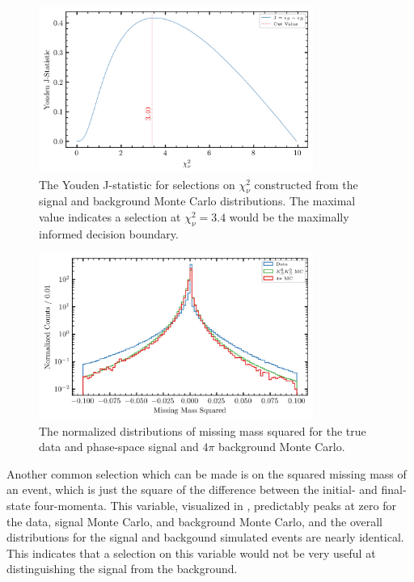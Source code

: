 \begin{figure}
  \begin{center}
    \includegraphics[width=0.8\textwidth]{figures/data_combined_chisqdof_youden_j.png}
  \end{center}
  \caption{The Youden J-statistic for selections on $\chi^2_\nu$ constructed from the signal and background Monte Carlo distributions. The maximal value indicates a selection at $\chi^2_\nu = 3.4$ would be the maximally informed decision boundary.}\label{fig:data-combined-chisqdof-youden-j}
\end{figure}


\begin{figure}
  \begin{center}
    \includegraphics[width=0.8\textwidth]{figures/data_combined_mm2.png}
  \end{center}
  \caption{The normalized distributions of missing mass squared for the true data and phase-space signal and $4\pi$ background Monte Carlo.}\label{fig:data-combined-mm2}
\end{figure}

Another common selection which can be made is on the squared missing mass of an event, which is just the square of the difference between the initial- and final-state four-momenta. This variable, visualized in , predictably peaks at zero for the data, signal Monte Carlo, and background Monte Carlo, and the overall distributions for the signal and backgound simulated events are nearly identical. This indicates that a selection on this variable would not be very useful at distinguishing the signal from the background.

